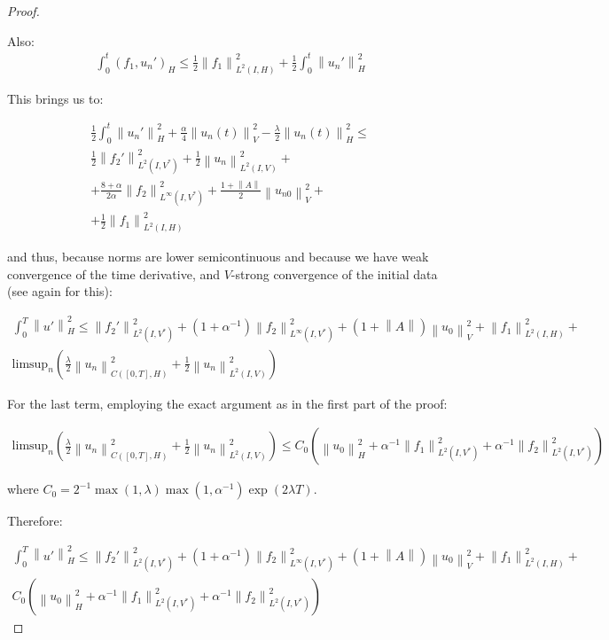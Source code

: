 \documentclass[english,a4paper,9pt,oneside]{scrbook}	%
\theoremstyle{break}
\newenvironment{mproof}[1][\proofname]{%
  \begin{proof}[#1]$ $\par\nobreak\ignorespaces
}{%
  \end{proof}
}
\renewcommand*{\proofname}{Proof}
\theoremstyle{remark}
\newcommand{\ds}{\displaystyle}
\newcommand{\norm}[1]{\left\lVert#1\right\rVert}
\newcommand{\HN}[1]{\norm{#1}_{H}}
\newcommand{\VN}[1]{\norm{#1}_{V}}
\begin{document}
\begin{appendices}
\begin{mproof}
Also:
\begin{align*}
\int_0^t(f_1,u_n')_H\leq \frac{1}{2}\norm{f_1}_{L^2(I,H)}^2+\frac{1}{2}\int_0^t\HN{u_n'}^2
\end{align*}

This brings us to:

\begin{align}
\label{eqn:weak_der_bound}
\frac{1}{2}\int_0^t\HN{u_n'}^2+\frac{\alpha}{4}\VN{u_n(t)}^2-\frac{\lambda}{2}\HN{u_n(t)}^2\leq \\
\frac{1}{2}\norm{f_2'}_{L^2(I,V^*)}^2 + \frac{1}{2}\norm{u_n}_{L^2(I,V)}^2 +\\
+ \frac{8+\alpha}{2\alpha}\norm{f_2}_{L^\infty(I,V^*)}^2+\frac{1+\norm{A}}{2}\VN{u_{n0}}^2+\\
+\frac{1}{2}\norm{f_1}_{L^2(I,H)}^2
\end{align}

and thus, because norms are lower semicontinuous and because we have weak convergence of the time derivative, and $V$-strong convergence of the initial data (see again \cite{gilardi} for this):

\begin{align*}
\int_0^T\HN{u'}^2\leq 
\norm{f_2'}_{L^2(I,V^*)}^2+(1+\alpha^{-1})\norm{f_2}_{L^\infty(I,V^*)}^2+(1+\norm{A})\VN{u_{0}}^2+\norm{f_1}_{L^2(I,H)}^2+\\
\text{limsup}_n \left ( \frac{\lambda}{2}\norm{u_n}_{C([0,T],H)}^2 + \frac{1}{2}\norm{u_n}_{L^2(I,V)}^2 \right )
\end{align*}


For the last term, employing the exact argument as in the first part of the proof:

\begin{align}
\label{eqn:limsup}
\text{limsup}_n \left ( \frac{\lambda}{2}\norm{u_n}_{C([0,T],H)}^2 + \frac{1}{2}\norm{u_n}_{L^2(I,V)}^2 \right )\leq C_0(\HN{u_0}^2+\alpha^{-1}\norm{f_1}^2_{L^2(I,V^*)}+\alpha^{-1}\norm{f_2}^2_{L^2(I,V^*)})
\end{align}


where $C_0 = \ds 2^{-1}\max(1,\lambda)\max(1,\alpha^{-1})\exp(2\lambda T)$.

Therefore:

\begin{align*}
\int_0^T\HN{u'}^2\leq 
\norm{f_2'}_{L^2(I,V^*)}^2+(1+\alpha^{-1})\norm{f_2}_{L^\infty(I,V^*)}^2+(1+\norm{A})\VN{u_{0}}^2+\norm{f_1}_{L^2(I,H)}^2+\\
C_0(\HN{u_0}^2+\alpha^{-1}\norm{f_1}^2_{L^2(I,V^*)}+\alpha^{-1}\norm{f_2}^2_{L^2(I,V^*)})
\end{align*}



\end{mproof}
\end{appendices}
\end{document}
